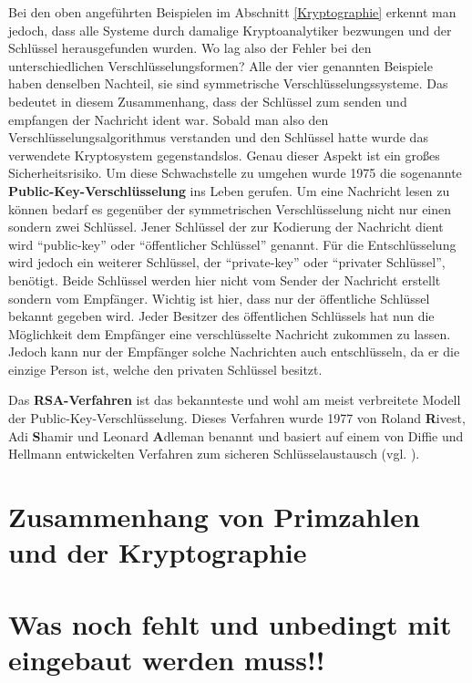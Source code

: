\documentclass[12pt,a4paper]{article}
\theoremstyle{definition}
\begin{document}
Bei den oben angeführten Beispielen im Abschnitt \ref{Kryptographie} erkennt man jedoch, dass alle Systeme durch damalige Kryptoanalytiker bezwungen und der Schlüssel herausgefunden wurden.
Wo lag also der Fehler bei den unterschiedlichen Verschlüsselungsformen?
Alle der vier genannten Beispiele haben denselben Nachteil, sie sind symmetrische Verschlüsselungssysteme.
Das bedeutet in diesem Zusammenhang, dass der Schlüssel zum senden und empfangen der Nachricht ident war.
Sobald man also den Verschlüsselungsalgorithmus verstanden und den Schlüssel hatte wurde das verwendete Kryptosystem gegenstandslos.
Genau dieser Aspekt ist ein großes Sicherheitsrisiko.
Um diese Schwachstelle zu umgehen wurde 1975 die sogenannte \textbf{Public-Key-Verschlüsselung} ins Leben gerufen.
Um eine Nachricht lesen zu können bedarf es gegenüber der symmetrischen Verschlüsselung nicht nur einen sondern zwei Schlüssel.
Jener Schlüssel der zur Kodierung der Nachricht dient wird “public-key” oder “öffentlicher Schlüssel” genannt.
Für die Entschlüsselung wird jedoch ein weiterer Schlüssel, der “private-key” oder “privater Schlüssel”, benötigt.
Beide Schlüssel werden hier nicht vom Sender der Nachricht erstellt sondern vom Empfänger.
Wichtig ist hier, dass nur der öffentliche Schlüssel bekannt gegeben wird.
Jeder Besitzer des öffentlichen Schlüssels hat nun die Möglichkeit dem Empfänger eine verschlüsselte Nachricht zukommen zu lassen.
Jedoch kann nur der Empfänger solche Nachrichten auch entschlüsseln, da er die einzige Person ist, welche den privaten Schlüssel besitzt.

Das \textbf{RSA-Verfahren} ist das bekannteste und wohl am meist verbreitete Modell der Public-Key-Verschlüsselung.
Dieses Verfahren wurde 1977 von Roland \textbf{R}ivest, Adi \textbf{S}hamir und Leonard \textbf{A}dleman benannt und basiert auf einem von Diffie und Hellmann entwickelten Verfahren zum sicheren Schlüsselaustausch (vgl. \cite[105]{RempeGillen2009}).

\section{Zusammenhang von Primzahlen und der Kryptographie}\label{Zusammenhang von Primzahlen und der Kryptographie}

\newpage

\section{Was noch fehlt und unbedingt mit eingebaut werden muss!!}
\end{document}
